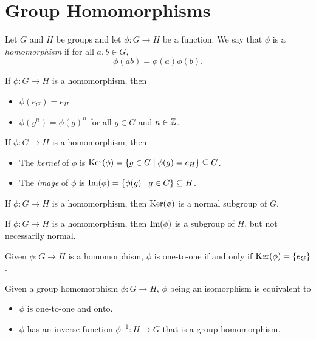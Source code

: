 \section*{Group Homomorphisms}

\begin{definition}
	Let $G$ and $H$ be groups and let $\phi : G \rightarrow H$ be a function. We
	say that $\phi$ is a \emph{homomorphism} if for all $a, b \in G$,
	\[
		\phi(ab) = \phi(a) \phi(b).
	\]
\end{definition}

\begin{theorem}
	If $\phi : G \rightarrow H$ is a homomorphism, then
	\begin{itemize}
		\item $\phi(e_G) = e_H$.
		\item $\phi(g^n) = {\phi(g)}^n$ for all $g \in G$ and $n \in {\mathbb{Z}}$.
	\end{itemize}
\end{theorem}

\begin{definition}
	If $\phi : G \rightarrow H$ is a homomorphism, then
	\begin{itemize}
		\item The \emph{kernel} of $\phi$ is $\text{Ker}(\phi) = \{g \in G \mid \phi(g) =
			e_H\} \subseteq G$.
		\item The \emph{image} of $\phi$ is $\text{Im}(\phi) = \{\phi(g) \mid g \in
			G\} \subseteq H$.
	\end{itemize}
\end{definition}

\begin{theorem}
	If $\phi : G \rightarrow H$ is a homomorphism, then $\text{Ker}(\phi)$ is a normal
	subgroup of $G$.
\end{theorem}

\begin{theorem}
	If $\phi : G \rightarrow H$ is a homomorphism, then $\text{Im}(\phi)$ is a
	subgroup of $H$, but not necessarily normal.
\end{theorem}

\begin{theorem}
	Given $\phi : G \rightarrow H$ is a homomorphism, $\phi$ is one-to-one if and
	only if $\text{Ker}(\phi) = \{e_G\}$.
\end{theorem}

\begin{theorem}
	Given a group homomorphism $\phi : G \rightarrow H$, $\phi$ being an
	isomorphism is equivalent to
	\begin{itemize}
		\item $\phi$ is one-to-one and onto.
		\item $\phi$ has an inverse function $\phi^{-1} : H \rightarrow G$ that is a
			group homomorphism.
	\end{itemize}
\end{theorem}

